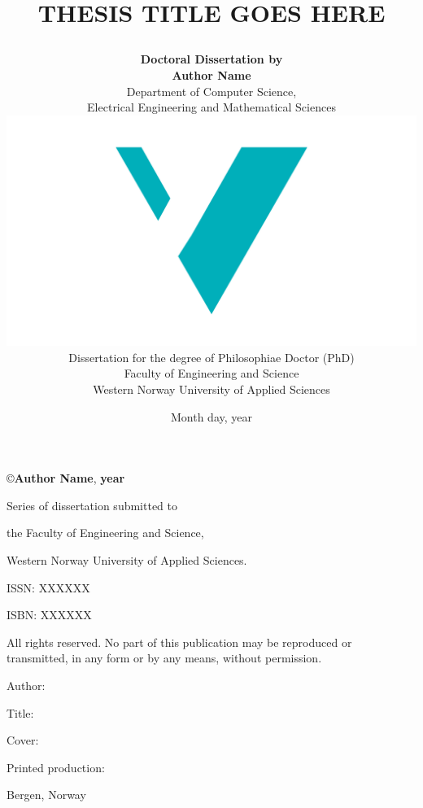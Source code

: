 \documentclass[12pt]{book} %
\title{
    {\fontsize{22}{24}\scshape{\color{Maroon}\MakeUppercase{Thesis Title Goes Here}}}
	\author{
        \textbf{Doctoral Dissertation by} \\ \textbf{Author Name}\vspace{1cm}\\
		Department of Computer Science, \\ 
		Electrical Engineering and Mathematical Sciences \vspace{1cm}\\
		\includegraphics[scale=0.36]{logos/logo.pdf}\vspace{2em}\\
		Dissertation for the degree of Philosophiae Doctor (PhD)\vspace{0.5em}\\
		Faculty of Engineering and Science \vspace{0.3cm}\\
		Western Norway University of Applied Sciences
	}
	\date{Month day, year}
}
\begin{document}

\newcommand{\TextSize}{13}
\newcommand{\BaseLineSkip}{15}
\fontsize{\TextSize}{\BaseLineSkip}
\selectfont

\maketitle
\thispagestyle{empty}

\normalsize\vspace*{12cm}
\begin{minipage}{13cm}
\copyright{\textbf{Author Name}}, \textbf{year}\vspace{5ex}  %

Series of dissertation submitted to

the Faculty of Engineering and Science,

Western Norway University of Applied Sciences.\vspace{3ex}

ISSN: XXXXXX 			 %

ISBN: XXXXXX\vspace{3ex} %

All rights reserved. No part of this publication may be reproduced or
transmitted, in any form or by any means, without permission.\vspace{3ex}

Author: 

Title: \vspace{5ex}

Cover: 

Printed production: \vspace{3ex}

Bergen, Norway
\end{minipage}


\end{document}
